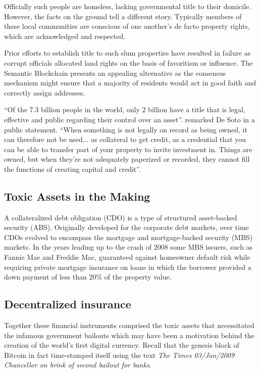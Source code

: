 Officially such people are homeless, lacking governmental title to their domicile. However, the facts on the ground tell a different story. Typically members of these local communities are conscious of one another's de facto property rights, which are acknowledged and respected.

Prior efforts to establish title to such slum properties have resulted in failure as corrupt officials allocated land rights on the basis of favoritism or influence. The Semantic Blockchain presents an appealing alternative as the consensus mechanism might ensure that a majority of residents would act in good faith and correctly assign addresses.

``Of the 7.3 billion people in the world, only 2 billion have a title that is legal, effective and public regarding their control over an asset''. remarked De Soto in a public statement. 
``When something is not legally on record as being owned, it can therefore not be used... as collateral to get credit, as a credential that you can be able to transfer part of your property to invite investment in. Things are owned, but when they're not adequately paperized or recorded, they cannot fill the functions of creating capital and credit''.

\subsection*{Toxic Assets in the Making}

A collateralized debt obligation (CDO) is a type of structured asset-backed security (ABS). 
Originally developed for the corporate debt markets, over time CDOs evolved to encompass the mortgage and mortgage-backed security (MBS) markets. 
In the years leading up to the crash of 2008 some MBS issuers, such as Fannie Mae and Freddie Mac, guaranteed against homeowner default risk while requiring private mortgage insurance on loans in which the borrower provided a down payment of less than 20\% of the property value.

\subsection*{Decentralized insurance}

Together these financial instruments comprised the toxic assets that necessitated the infamous government bailouts which may have been a motivation behind the creation of the world's first digital currency.
Recall that the genesis block of Bitcoin in fact time-stamped itself using the text \textit{The Times 03/Jan/2009 Chancellor on brink of second bailout for banks}.

